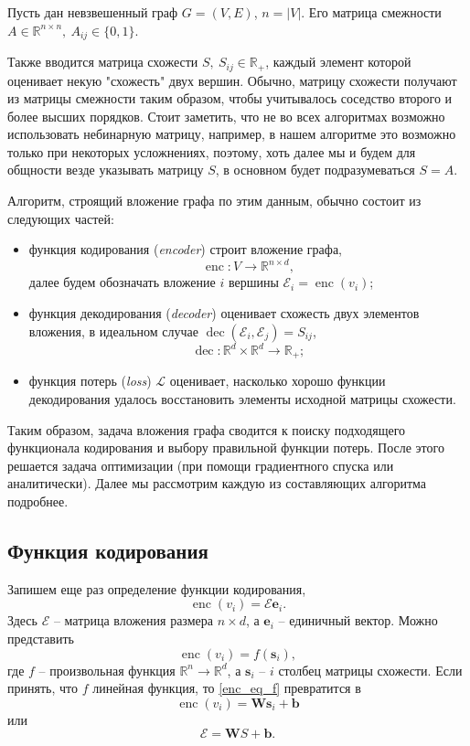 \documentclass[12pt,a4paper]{extarticle}
\newcommand{\R}{\mathbb{R}}
\newcommand{\E}{\mathcal{E}}
\newcommand{\W}{\textbf{W}}
\newcommand{\s}{\textbf{s}}
\newcommand{\Loss}{\mathcal{L}}
\newcommand{\encoder}{\operatorname{enc}}
\newcommand{\decoder}{\operatorname{dec}}
\newcommand{\unit}[1]{\textbf{e}_{#1}}
\begin{document}
    Пусть дан невзвешенный граф $G = (V, E)$, $n = |V|$. Его матрица смежности $A \in \R^{n \times n},\ A_{ij} \in \{0, 1\}$.
    
    Также вводится матрица схожести $S,\ S_{ij} \in \R_{+}$,  каждый элемент которой оценивает некую "схожесть" двух вершин. Обычно, матрицу схожести получают из матрицы смежности таким образом, чтобы учитывалось соседство второго и более высших порядков. Стоит заметить, что не во всех алгоритмах возможно использовать небинарную матрицу, например, в нашем алгоритме это возможно только при некоторых усложнениях, поэтому, хоть далее мы и будем для общности везде указывать матрицу $S$, в основном будет подразумеваться $S = A$.
    
    Алгоритм, строящий вложение графа по этим данным, обычно состоит из следующих частей:
    \begin{itemize}
        \item функция кодирования (\textit{encoder}) строит вложение графа,
            \[
            \encoder: V \to \R^{n \times d},
            \]
            далее будем обозначать вложение $i$ вершины $\E_i = \encoder(v_i)$;
        \item функция декодирования (\textit{decoder}) оценивает схожесть двух элементов вложения,
            в идеальном случае $\decoder(\E_i, \E_j) = S_{ij}$,
            \[\decoder: \R^{d} \times \R^{d} \to \R_+;\]
        \item функция потерь (\textit{loss}) $\Loss$ оценивает, насколько хорошо функции декодирования удалось восстановить элементы исходной матрицы схожести.
    \end{itemize}
    
    Таким образом, задача вложения графа сводится к поиску подходящего функционала кодирования и выбору правильной функции потерь. После этого решается задача оптимизации (при помощи градиентного спуска или аналитически). Далее мы рассмотрим каждую из составляющих алгоритма подробнее.

    \subsection{Функция кодирования}
    Запишем еще раз определение функции кодирования,
    \begin{equation}
        \encoder(v_i) = \E\unit{i}.
    \end{equation}
    Здесь $\E$ -- матрица вложения размера $n \times d$, а $\unit{i}$ -- единичный вектор. Можно представить
    \begin{equation} \label{enc_eq_f}
        \encoder(v_i) = f(\s_i),
    \end{equation}
    где $f$ -- произвольная функция $\R^n \to \R^d$, а $\s_i$ -- $i$ столбец матрицы схожести.
    Если принять, что $f$ линейная функция, то \eqref{enc_eq_f} превратится в
    \begin{equation}
        \encoder(v_i) = \W\s_i + \textbf{b}
    \end{equation}
    или
    \begin{equation}
        \E = \W S + \textbf{b}.
    \end{equation}
    
\end{document}
